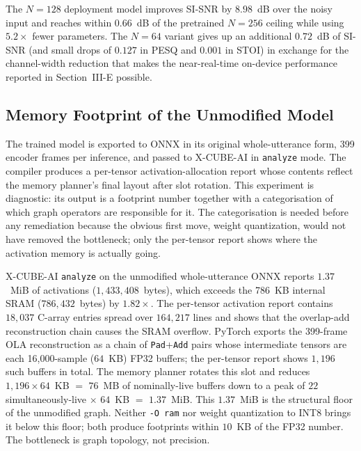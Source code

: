 \documentclass[conference]{IEEEtran}
\begin{document}
The $N=128$ deployment model improves SI-SNR by $8.98$~dB over the noisy input and reaches within $0.66$~dB of the pretrained $N=256$ ceiling while using $5.2\times$ fewer parameters. The $N=64$ variant gives up an additional $0.72$~dB of SI-SNR (and small drops of $0.127$ in PESQ and $0.001$ in STOI) in exchange for the channel-width reduction that makes the near-real-time on-device performance reported in Section~III-E possible.


\subsection{Memory Footprint of the Unmodified Model}
The trained model is exported to ONNX in its original whole-utterance form, 399 encoder frames per inference, and passed to X-CUBE-AI in \texttt{analyze} mode. The compiler produces a per-tensor activation-allocation report whose contents reflect the memory planner's final layout after slot rotation. This experiment is diagnostic: its output is a footprint number together with a categorisation of which graph operators are responsible for it. The categorisation is needed before any remediation because the obvious first move, weight quantization, would not have removed the bottleneck; only the per-tensor report shows where the activation memory is actually going.

X-CUBE-AI \texttt{analyze} on the unmodified whole-utterance ONNX reports $1.37$~MiB of activations ($1{,}433{,}408$~bytes), which exceeds the 786~KB internal SRAM ($786{,}432$~bytes) by $1.82\times$. The per-tensor activation report contains $18{,}037$ C-array entries spread over $164{,}217$ lines and shows that the overlap-add reconstruction chain causes the SRAM overflow. PyTorch exports the 399-frame OLA reconstruction as a chain of \texttt{Pad}+\texttt{Add} pairs whose intermediate tensors are each 16{,}000-sample ($64$~KB) FP32 buffers; the per-tensor report shows $1{,}196$ such buffers in total. The memory planner rotates this slot and reduces $1{,}196 \times 64$~KB $=$ $76$~MB of nominally-live buffers down to a peak of $22$ simultaneously-live $\times$ $64$~KB $=$ $1.37$~MiB. This $1.37$~MiB is the structural floor of the unmodified graph. Neither \texttt{-O ram} nor weight quantization to INT8 brings it below this floor; both produce footprints within $10$~KB of the FP32 number. The bottleneck is graph topology, not precision.
\end{document}
